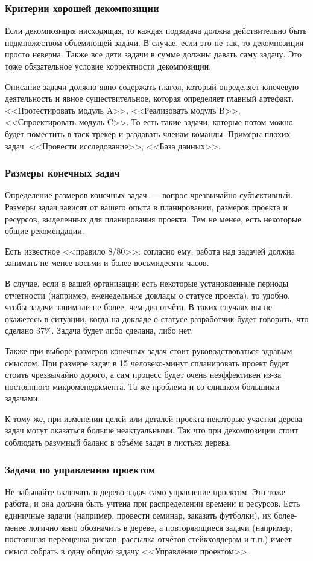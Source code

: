 \documentclass{../../text-style}
\begin{document}
\subsubsection{Критерии хорошей декомпозиции}

Если декомпозиция нисходящая, то каждая подзадача должна действительно быть подмножеством объемлющей задачи. В случае, если это не так, то декомпозиция просто неверна. Также все дети задачи в сумме должны давать саму задачу. Это тоже обязательное условие корректности декомпозиции.

Описание задачи должно явно содержать глагол, который определяет ключевую деятельность и явное существительное, которая определяет главный артефакт. <<Протестировать модуль A>>, <<Реализовать модуль B>>, <<Спроектировать модуль C>>. То есть такие задачи, которые потом можно будет поместить в таск-трекер и раздавать членам команды. Примеры плохих задач: <<Провести исследование>>, <<База данных>>.

\subsubsection{Размеры конечных задач}

Определение размеров конечных задач~--- вопрос чрезвычайно субъективный. Размеры задач зависят от вашего опыта в планировании, размеров проекта и ресурсов, выделенных для планирования проекта. Тем не менее, есть некоторые общие рекомендации.

Есть известное <<правило 8/80>>: согласно ему, работа над задачей должна занимать не менее восьми и более восьмидесяти часов.

В случае, если в вашей организации есть некоторые установленные периоды отчетности (например, еженедельные доклады о статусе проекта), то удобно, чтобы задачи занимали не более, чем два отчёта. В таких случаях вы не окажетесь в ситуации, когда на докладе о статусе разработчик будет говорить, что сделано 37\%. Задача будет либо сделана, либо нет.

Также при выборе размеров конечных задач стоит руководствоваться здравым смыслом. При размере задач в 15 человеко-минут спланировать проект будет стоить чрезвычайно дорого, а сам процесс будет очень неэффективен из-за постоянного микроменеджмента. Та же проблема и со слишком большими задачами.

К тому же, при изменении целей или деталей проекта некоторые участки дерева задач могут оказаться больше неактуальными. Так что при декомпозиции стоит соблюдать разумный баланс в объёме задач в листьях дерева.

\subsubsection{Задачи по управлению проектом}

Не забывайте включать в дерево задач само управление проектом. Это тоже работа, и она должна быть учтена при распределении времени и ресурсов. Есть единичные задачи (например, провести семинар, заказать футболки), их более-менее логично явно обозначить в дереве, а повторяющиеся задачи (например, постоянная переоценка рисков, рассылка отчётов стейкхолдерам и т.п.) имеет смысл собрать в одну общую задачу <<Управление проектом>>.
\end{document}
